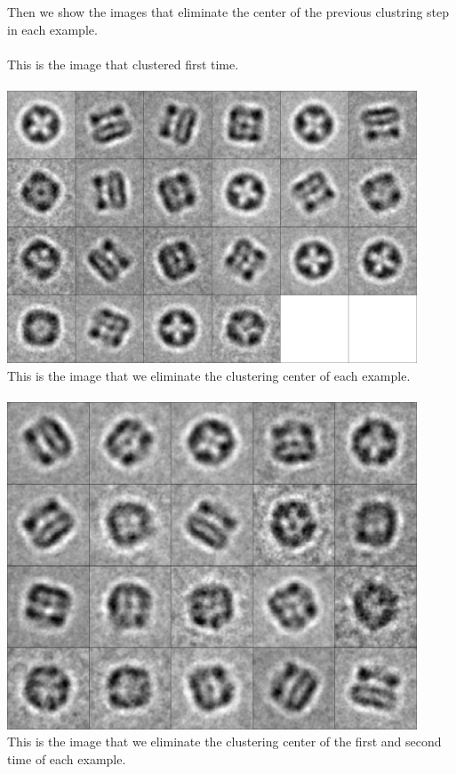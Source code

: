 \documentclass{article}
\begin{document}
\par
Then we show the images that eliminate the center of the previous clustring step in each example.\\
~\\
This is the image that clustered first time.\\
~\\
\includegraphics[width=4.8in]{t_first}
~\\
This is the image that we eliminate the clustering center of each example.\\
~\\
\includegraphics[width=4.8in]{t_second}
~\\
This is the image that we eliminate the clustering center of the first and second time of each example.\\
~\\
\end{document}
